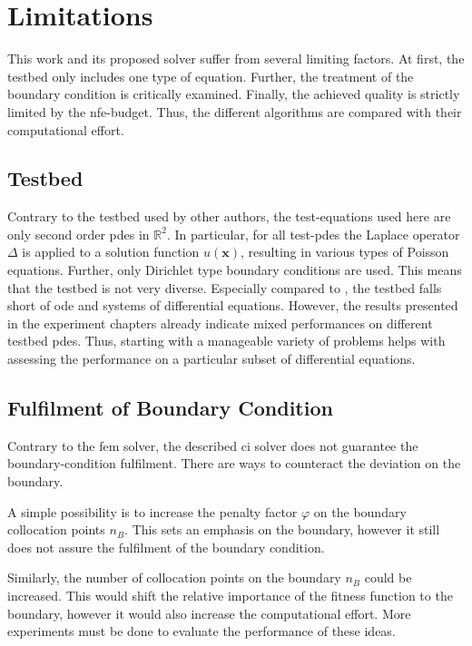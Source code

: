 \documentclass[./\jobname.tex]{subfiles}
\begin{document}
\chapter{Limitations}
This work and its proposed solver suffer from several limiting factors. At first, the testbed only includes one type of equation. Further, the treatment of the boundary condition is critically examined. Finally, the achieved quality is strictly limited by the \gls{nfe}-budget. Thus, the different algorithms are compared with their computational effort. 

\section{Testbed}

Contrary to the testbed used by other authors, the test-equations used here are only second order \gls{pde}s in $\mathbb{R}^2$. In particular, for all test-\gls{pde}s the Laplace operator $\Delta$ is applied to a solution function $u(\mathbf{x})$, resulting in various types of Poisson equations. Further, only Dirichlet type boundary conditions are used. This means that the testbed is not very diverse. Especially compared to \cite{chaquet_using_2019}, the testbed falls short of \gls{ode} and systems of differential equations. However, the results presented in the experiment chapters already indicate mixed performances on different testbed \gls{pde}s. Thus, starting with a manageable variety of problems helps with assessing the performance on a particular subset of differential equations.  


\section{Fulfilment of Boundary Condition}
Contrary to the \gls{fem} solver, the described \gls{ci} solver does not guarantee the boundary-condition fulfilment. There are ways to counteract the deviation on the boundary. 

A simple possibility is to increase the penalty factor $\varphi$ on the boundary collocation points $n_B$. This sets an emphasis on the boundary, however it still does not assure the fulfilment of the boundary condition. 

Similarly, the number of collocation points on the boundary $n_B$ could be increased. This would shift the relative importance of the fitness function to the boundary, however it would also increase the computational effort. More experiments must be done to evaluate the performance of these ideas. 
\end{document}
